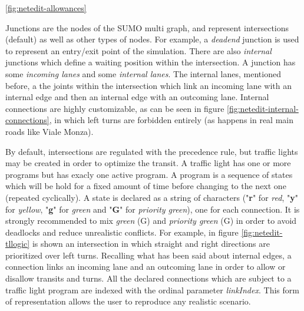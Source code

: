 \ref{fig:netedit-allowances}

Junctions are the nodes of the SUMO multi graph, and represent intersections (default) as well as other types of nodes. For example, a \textit{deadend} junction is used to represent an entry/exit point of the simulation. There are also \textit{internal} junctions which define a waiting position within the intersection. A junction has some \textit{incoming lanes} and some \textit{internal lanes}. The internal lanes, mentioned before, a the joints within the intersection which link an incoming lane with an internal edge and then an internal edge with an outcoming lane. Internal connections are highly customizable, as can be seen in figure \ref{fig:netedit-internal-connections}, in which left turns are forbidden entirely (as happens in real main roads like Viale Monza).


By default, intersections are regulated with the precedence rule, but traffic lights may be created in order to optimize the transit. A traffic light has one or more programs but has exacly one active program. A program is a sequence of states which will be hold for a fixed amount of time before changing to the next one (repeated cyclically). A state is declared as a string of characters ("\textbf{r}" for \textit{red}, "\textbf{y}" for \textit{yellow}, "\textbf{g}" for \textit{green} and "\textbf{G}" for \textit{priority green}), one for each connection. It is strongly recommended to mix \textit{green} (G) and \textit{priority green} (G) in order to avoid deadlocks and reduce unrealistic conflicts. For example, in figure \ref{fig:netedit-tllogic} is shown an intersection in which straight and right directions are prioritized over left turns. Recalling what has been said about internal edges, a connection links an incoming lane and an outcoming lane in order to allow or disallow transits and turns. All the declared connections which are subject to a traffic light program are indexed with the ordinal parameter \textit{linkIndex}. This form of representation allows the user to reproduce any realistic scenario.

